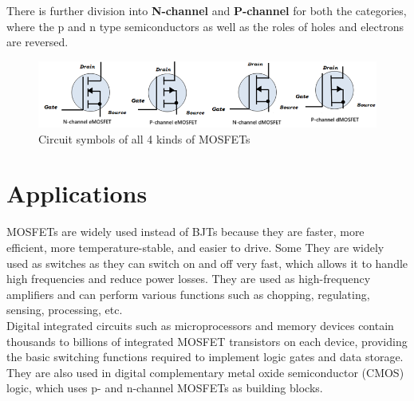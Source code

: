 There is further division into \textbf{N-channel} and \textbf{P-channel} for both the categories, where the p and n type semiconductors as well as the roles of holes and electrons are reversed.

\begin{figure}[H]
    \centering
    \includegraphics[width=1\columnwidth]{images/types1.png}
    \caption{Circuit symbols of all 4 kinds of MOSFETs}
\end{figure}

\section*{Applications}
MOSFETs are widely used instead of BJTs because they are faster, more efficient, more temperature-stable, and easier to drive. Some They are widely used as switches as they can switch on and off very fast, which allows it to handle high frequencies and reduce power losses. They are used as high-frequency amplifiers and can perform various functions such as chopping, regulating, sensing, processing, etc.\\

Digital integrated circuits such as microprocessors and memory devices contain thousands to billions of integrated MOSFET transistors on each device, providing the basic switching functions required to implement logic gates and data storage. They are also used in digital complementary metal oxide semiconductor (CMOS) logic, which uses p- and n-channel MOSFETs as building blocks.